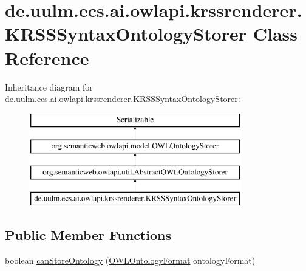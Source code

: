 \hypertarget{classde_1_1uulm_1_1ecs_1_1ai_1_1owlapi_1_1krssrenderer_1_1_k_r_s_s_syntax_ontology_storer}{\section{de.\-uulm.\-ecs.\-ai.\-owlapi.\-krssrenderer.\-K\-R\-S\-S\-Syntax\-Ontology\-Storer Class Reference}
\label{classde_1_1uulm_1_1ecs_1_1ai_1_1owlapi_1_1krssrenderer_1_1_k_r_s_s_syntax_ontology_storer}
}
Inheritance diagram for de.\-uulm.\-ecs.\-ai.\-owlapi.\-krssrenderer.\-K\-R\-S\-S\-Syntax\-Ontology\-Storer\-:\begin{figure}[H]
\begin{center}
\leavevmode
\includegraphics[height=4.000000cm]{classde_1_1uulm_1_1ecs_1_1ai_1_1owlapi_1_1krssrenderer_1_1_k_r_s_s_syntax_ontology_storer}
\end{center}
\end{figure}
\subsection*{Public Member Functions}
\begin{DoxyCompactItemize}
\item 
boolean \hyperlink{classde_1_1uulm_1_1ecs_1_1ai_1_1owlapi_1_1krssrenderer_1_1_k_r_s_s_syntax_ontology_storer_abd393e3e72255f2fe52b6e86884da6af}{can\-Store\-Ontology} (\hyperlink{classorg_1_1semanticweb_1_1owlapi_1_1model_1_1_o_w_l_ontology_format}{O\-W\-L\-Ontology\-Format} ontology\-Format)
\end{DoxyCompactItemize}
